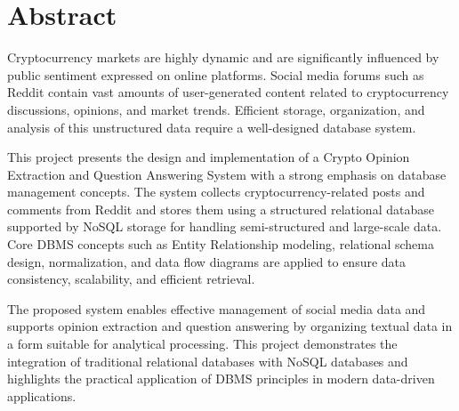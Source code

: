 
\newpage
\chapter*{Abstract}

Cryptocurrency markets are highly dynamic and are significantly influenced by public sentiment expressed on online platforms. Social media forums such as Reddit contain vast amounts of user-generated content related to cryptocurrency discussions, opinions, and market trends. Efficient storage, organization, and analysis of this unstructured data require a well-designed database system.

This project presents the design and implementation of a Crypto Opinion Extraction and Question Answering System with a strong emphasis on database management concepts. The system collects cryptocurrency-related posts and comments from Reddit and stores them using a structured relational database supported by NoSQL storage for handling semi-structured and large-scale data. Core DBMS concepts such as Entity Relationship modeling, relational schema design, normalization, and data flow diagrams are applied to ensure data consistency, scalability, and efficient retrieval.

The proposed system enables effective management of social media data and supports opinion extraction and question answering by organizing textual data in a form suitable for analytical processing. This project demonstrates the integration of traditional relational databases with NoSQL databases and highlights the practical application of DBMS principles in modern data-driven applications.
